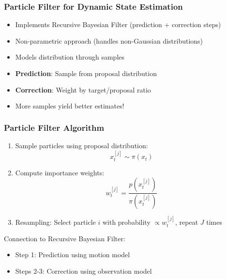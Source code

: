 \begin{frame}
    \frametitle{Particle Filter for Dynamic State Estimation}

    \begin{itemize}
        \item Implements Recursive Bayesian Filter (prediction + correction steps)
        \item Non-parametric approach (handles non-Gaussian distributions)
        \item Models distribution through samples
        \item \textbf{Prediction}: Sample from proposal distribution
        \item \textbf{Correction}: Weight by target/proposal ratio
        \item \alert{More samples yield better estimates!}
    \end{itemize}
\end{frame}

\begin{frame}
    \frametitle{Particle Filter Algorithm}

    \begin{enumerate}
        \item Sample particles using proposal distribution:
        \begin{equation*}
            x_{t}^{[j]} \sim \pi(x_t) 
        \end{equation*}
        \item Compute importance weights:
        \begin{equation*}
            w_t^{[j]} = \frac{p(x_t^{[j]})}{\pi(x_t^{[j]})}
        \end{equation*}
        \item Resampling: Select particle $i$ with probability $\propto w_t^{[j]}$, repeat $J$ times
    \end{enumerate}

    Connection to Recursive Bayesian Filter:
    \begin{itemize}
        \item Step 1: Prediction using motion model
        \item Steps 2-3: Correction using observation model
    \end{itemize}
\end{frame}

